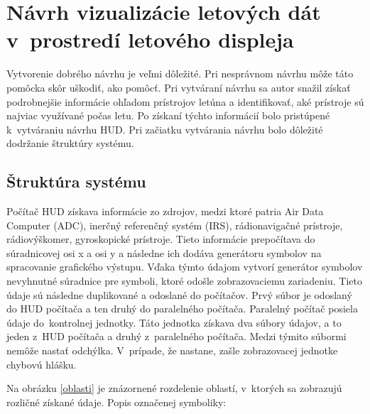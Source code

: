 \chapter{Návrh vizualizácie letových dát v~prostredí letového displeja}
Vytvorenie dobrého návrhu je veľmi dôležité. Pri nesprávnom návrhu môže táto pomôcka skôr uškodiť, ako pomôcť. Pri vytváraní návrhu sa autor snažil získať podrobnejšie informácie ohľadom prístrojov letúna a identifikovať, aké prístroje sú najviac využívané počas letu. Po získaní týchto informácií bolo pristúpené k~vytváraniu návrhu HUD. Pri začiatku vytvárania návrhu bolo dôležité dodržanie štruktúry systému.

\section{Štruktúra systému}
Počítač HUD získava informácie zo zdrojov, medzi ktoré patria Air Data Computer (ADC), inerčný referenčný systém (IRS), rádionavigačné prístroje, rádiovýškomer, gyroskopické prístroje. Tieto informácie prepočítava do súradnicovej osi x a osi y a následne ich dodáva generátoru symbolov na spracovanie grafického výstupu. Vďaka týmto údajom vytvorí generátor symbolov nevyhnutné súradnice pre symboli, ktoré odošle zobrazovaciemu zariadeniu. Tieto údaje sú následne duplikované a odoslané do počítačov. Prvý súbor je odoslaný do HUD počítača a ten druhý do paralelného počítača. Paralelný počítač posiela údaje do~kontrolnej jednotky. Táto jednotka získava dva súbory údajov, a to jeden z~HUD počítača a druhý z~paralelného počítača. Medzi týmito súbormi nemôže nastať odchýlka. V~prípade, že nastane, zašle zobrazovacej jednotke chybovú hlášku. 

Na obrázku \ref{oblasti} je znázornené rozdelenie oblastí, v~ktorých sa zobrazujú rozličné získané údaje. Popis označenej symboliky:

